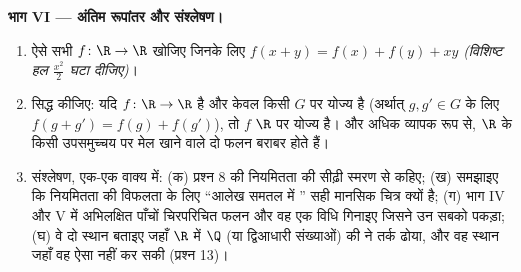 \begin{problem}[{सप्ताहांत समस्या --- $f(x + y) = f(x) + f(y)$: नियमितता रैखिकता पर बाध्य कर देती है, और राक्षसों
का चित्र}]
\medskip \noindent\textbf{भाग VI --- अंतिम रूपांतर और संश्लेषण।}
\begin{enumerate}[resume]
  \item ऐसे सभी  $f \colon \R \to \R$ खोजिए जिनके लिए $f(x + y) = f(x) +
  f(y) + xy$ \emph{(विशिष्ट हल $\frac{x^2}{2}$ घटा दीजिए)}।
  \item सिद्ध कीजिए: यदि $f \colon \R \to \R$  है और केवल किसी \emph{
  } $G$ पर योज्य है (अर्थात् $g, g' \in G$ के लिए $f(g + g') = f(g) +
  f(g')$), तो $f$ $\R$ पर योज्य है। और अधिक व्यापक रूप से, $\R$ के किसी 
  उपसमुच्चय पर मेल खाने वाले दो  फलन बराबर होते हैं।
  \item संश्लेषण, एक-एक वाक्य में: (क) प्रश्न 8 की नियमितता की सीढ़ी स्मरण
  से कहिए; (ख) समझाइए कि नियमितता की विफलता के लिए ``आलेख समतल में '' सही
  मानसिक चित्र क्यों है; (ग) भाग IV और V में अभिलक्षित पाँचों चिरपरिचित फलन
  और वह एक विधि गिनाइए जिसने उन सबको पकड़ा; (घ) वे दो स्थान बताइए जहाँ $\R$
  में $\Q$ (या द्विआधारी संख्याओं) की  ने तर्क ढोया, और वह स्थान जहाँ
  वह ऐसा नहीं कर सकी (प्रश्न 13)।
\end{enumerate}
\end{problem}
